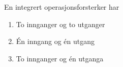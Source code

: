 \begin{question}[name=Oppgave, topic=operasjonsforsterker]
	En integrert operasjonsforsterker har
	\begin{enumerate}[label=\roman*)]
		\item To innganger og to utganger
		\item Én inngang og én utgang
		\item To innganger og én utganga
	\end{enumerate}
\end{question}

